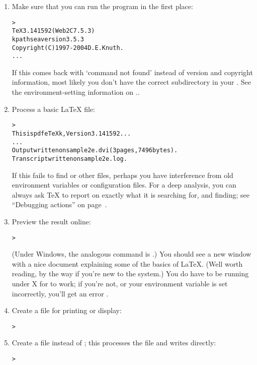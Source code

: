 \documentclass{article}
\begin{document}
\begin{enumerate}

\item Make sure that you can run the  program in the first
place:

\begin{alltt}
> 
TeX 3.141592 (Web2C 7.5.3)
kpathsea version 3.5.3
Copyright (C) 1997-2004 D.E. Knuth.
...
\end{alltt}
If this comes back with `command not found' instead of version and
copyright information, most likely you don't have the correct
 subdirectory in your .  See
the environment-setting information on \p.\pageref{text:path}.

\item Process a basic \LaTeX{} file:
\begin{alltt}
> 
This is pdfeTeXk, Version 3.141592...
...
Output written on sample2e.dvi (3 pages, 7496 bytes).
Transcript written on sample2e.log.
\end{alltt}
If this fails to find  or other files, perhaps
you have interference from old environment variables or configuration
files.  For a deep analysis, you can always ask \TeX{} to report on
exactly what it is searching for, and finding; see ``Debugging actions''
on page~\pageref{Debugging}.

\item Preview the result online:
\begin{alltt}
> 
\end{alltt}
(Under Windows, the analogous command is .)  You should
see a new window with a nice document explaining some of the basics of
\LaTeX{}.  (Well worth reading, by the way if you're new to the system.)
You do have to be running under X for  to work; if you're
not, or your  environment variable is set incorrectly,
you'll get an error .

\item Create a \PS{} file for printing or display:
\begin{alltt}
> 
\end{alltt}

\item Create a  file instead of \dvi{}; this processes the
 file and writes  directly:
\begin{alltt}
> 
\end{alltt}


\end{enumerate}
\end{document}
